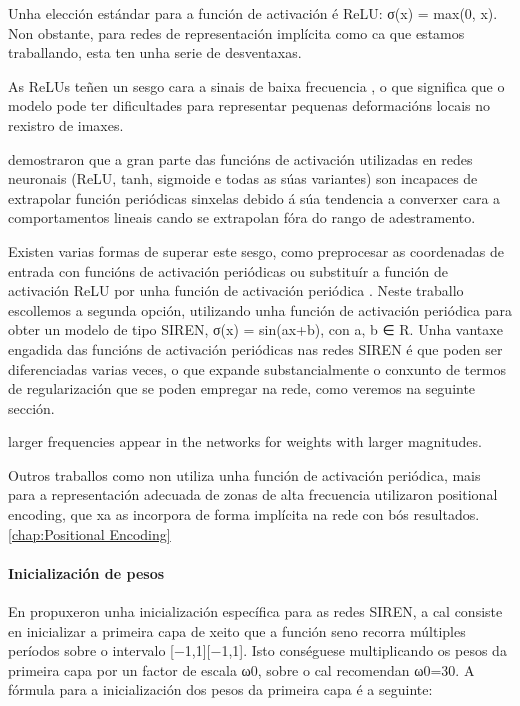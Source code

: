 Unha elección estándar para a función de activación é ReLU: σ(x) = max(0, x). 
Non obstante, para redes de representación implícita como ca que estamos traballando, esta ten unha serie de desventaxas.

As ReLUs teñen un sesgo cara a sinais de baixa frecuencia \cite{rahaman2019spectralbiasneuralnetworks}, 
 o que significa que o modelo pode ter dificultades para representar pequenas deformacións locais no rexistro de imaxes.
 
\cite{ziyin2020neuralnetworksfaillearn} demostraron que a gran parte das funcións de activación utilizadas en redes neuronais (ReLU, tanh, sigmoide e todas as súas variantes)
son incapaces de extrapolar función periódicas sinxelas debido á súa tendencia a converxer cara a comportamentos lineais cando se extrapolan fóra do rango de adestramento. 

Existen varias formas de superar este sesgo, como preprocesar as coordenadas de entrada con funcións de activación periódicas \cite{mildenhall2020nerfrepresentingscenesneural} 
ou substituír a función de activación ReLU por unha función de activación periódica \cite{sitzmann2020implicitneuralrepresentationsperiodic}.
Neste traballo escollemos a segunda opción, utilizando unha función de activación periódica para obter un modelo de tipo SIREN, σ(x) = sin(ax+b), con a, b ∈ R.
Unha vantaxe engadida das funcións de activación periódicas nas redes SIREN é que poden ser diferenciadas varias veces, 
o que expande substancialmente o conxunto de termos de regularización que se poden empregar na rede, como veremos na seguinte sección.

larger frequencies appear in the networks for weights with larger magnitudes.

Outros traballos como \cite{mildenhall2020nerfrepresentingscenesneural} non utiliza unha función de activación periódica, mais para a representación adecuada de zonas de alta frecuencia 
utilizaron positional encoding, que xa as incorpora de forma implícita na rede con bós resultados. \ref{chap:Positional Encoding}


\paragraph{Inicialización de pesos}

En \cite{sitzmann2020implicitneuralrepresentationsperiodic} propuxeron unha inicialización específica para as redes SIREN, 
a cal consiste en inicializar a primeira capa de xeito que a función seno recorra múltiples períodos sobre o intervalo [−1,1][−1,1].
Isto conséguese multiplicando os pesos da primeira capa por un factor de escala ω0, sobre o cal recomendan ω0=30.
A fórmula para a inicialización dos pesos da primeira capa é a seguinte:

